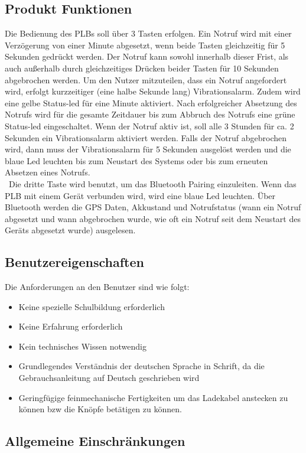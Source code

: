 \subsection{Produkt Funktionen}
Die Bedienung des PLBs soll über 3 Tasten erfolgen. Ein Notruf wird mit einer Verzögerung von einer Minute abgesetzt, wenn beide Tasten gleichzeitig für 5 Sekunden gedrückt werden. Der Notruf kann sowohl innerhalb dieser Frist, als auch außerhalb durch gleichzeitiges Drücken beider Tasten für 10 Sekunden abgebrochen werden. 
Um den Nutzer mitzuteilen, dass ein Notruf angefordert wird, erfolgt kurzzeitiger (eine  halbe Sekunde lang) Vibrationsalarm. Zudem wird eine gelbe Status-led für eine Minute aktiviert. Nach erfolgreicher Absetzung des Notrufs wird für die gesamte Zeitdauer bis zum Abbruch des Notrufs eine grüne Status-led eingeschaltet. Wenn der Notruf aktiv ist, soll alle 3 Stunden für ca. 2 Sekunden ein Vibrationsalarm aktiviert werden. Falls der Notruf abgebrochen wird, dann muss der Vibrationsalarm für 5 Sekunden ausgelöst werden und die blaue Led leuchten bis zum Neustart des Systems oder bis zum erneuten Absetzen eines Notrufs.\\\
Die dritte Taste wird benutzt, um das Bluetooth Pairing einzuleiten. Wenn das PLB mit einem Gerät verbunden wird, wird eine blaue Led leuchten. Über Bluetooth werden die GPS Daten, Akkustand und Notrufstatus (wann ein Notruf abgesetzt und wann abgebrochen wurde, wie oft ein Notruf seit dem Neustart des Geräts abgesetzt wurde) ausgelesen.
\subsection{Benutzereigenschaften}
Die Anforderungen an den Benutzer sind wie folgt:
\begin{itemize}
	\item Keine spezielle Schulbildung erforderlich
	\item Keine Erfahrung erforderlich
	\item Kein technisches Wissen notwendig
	\item Grundlegendes Verständnis der deutschen Sprache in Schrift, da die Gebrauchsanleitung auf Deutsch geschrieben wird
	\item Geringfügige feinmechanische Fertigkeiten um das Ladekabel anstecken zu können bzw die Knöpfe betätigen zu können.
\end{itemize}

\subsection{Allgemeine Einschränkungen}

